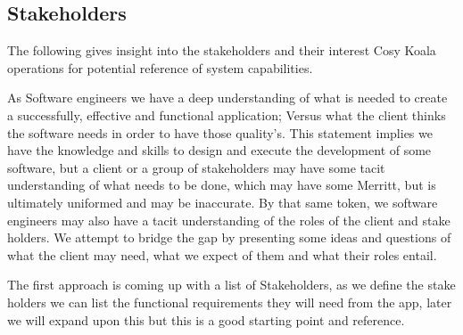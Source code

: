 \documentclass{article}
\begin{document}

\subsection{Stakeholders} 
The following gives insight into the stakeholders and their interest Cosy Koala operations for potential reference of system capabilities.

As Software engineers we have a deep understanding of what is needed to create a successfully, effective and functional application; Versus what the client thinks the software needs in order to have those quality's. This statement implies we have the knowledge and skills to design and execute the development of some software, but a client or a group of stakeholders may have some tacit understanding of what needs to be done, which may have some Merritt, but is ultimately uniformed and may be inaccurate. By that same token, we software engineers may also have a tacit understanding of the roles of the client and stake holders. We attempt to bridge the gap by presenting some ideas and questions of what the client may need, what we expect of them and what their roles entail. 

The first approach is coming up with a list of Stakeholders, as we define the stake holders we can list the functional requirements they will need from the app, later we will expand upon this but this is a good starting point and reference.
\end{document}
